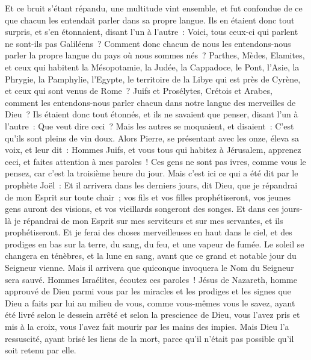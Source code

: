 \begin{multicols}{2}
Et ce bruit s'étant répandu, une multitude vint ensemble, et fut confondue de ce que chacun les entendait parler dans sa propre langue. 
Ils en étaient donc tout surpris, et s'en étonnaient, disant l'un à l'autre~: Voici, tous ceux-ci qui parlent ne sont-ils pas Galiléens~?
Comment donc chacun de nous les entendons-nous parler la propre langue du pays où nous sommes nés~? 
Parthes, Mèdes, Elamites, et ceux qui habitent la Mésopotamie, la Judée, la Cappadoce, le Pont, l'Asie,
la Phrygie, la Pamphylie, l'Egypte, le territoire de la Libye qui est près de Cyrène, et ceux qui sont venus de Rome~? Juifs et Prosélytes,
 Crétois et Arabes, comment les entendons-nous parler chacun dans notre langue des merveilles de Dieu~?
Ils étaient donc tout étonnés, et ils ne savaient que penser, disant l'un à l'autre~: Que veut dire ceci~?
Mais les autres se moquaient, et disaient~: C'est qu'ils sont pleins de vin doux.
Alors Pierre, se présentant avec les onze, éleva sa voix, et leur dit~: Hommes Juifs, et vous tous qui habitez à Jérusalem, apprenez ceci, et faites attention à mes paroles~!
Ces gens ne sont pas ivres, comme vous le pensez, car c'est la troisième heure du jour.
Mais c'est ici ce qui a été dit par le prophète Joël~:
Et il arrivera dans les derniers jours, dit Dieu, que je répandrai de mon Esprit sur toute chair~; vos fils et vos filles prophétiseront, vos jeunes gens auront des visions, et vos vieillards songeront des songes.
Et dans ces jours-là je répandrai de mon Esprit sur mes serviteurs et sur mes servantes, et ils prophétiseront.
Et je ferai des choses merveilleuses en haut dans le ciel, et des prodiges en bas sur la terre, du sang, du feu, et une vapeur de fumée.
Le soleil se changera en ténèbres, et la lune en sang, avant que ce grand et notable jour du Seigneur vienne.
Mais il arrivera que quiconque invoquera le Nom du Seigneur sera sauvé.
Hommes Israélites, écoutez ces paroles~! Jésus de Nazareth, homme approuvé de Dieu parmi vous par les miracles et les prodiges et les signes que Dieu a faits par lui au milieu de vous, comme vous-mêmes vous le savez,
ayant été livré selon le dessein arrêté et selon la prescience de Dieu, vous l'avez pris et mis à la croix, vous l'avez fait mourir par les mains des impies.
Mais Dieu l'a ressuscité, ayant brisé les liens de la mort, parce qu'il n'était pas possible qu'il soit retenu par elle.

\end{multicols}
